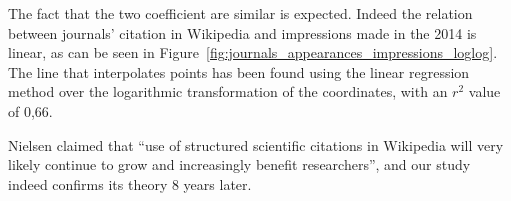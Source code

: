 The fact that the two coefficient are similar is expected.
Indeed the relation between journals' citation in Wikipedia and impressions made in the 2014 is linear, as can be seen in Figure~\ref{fig:journals_appearances_impressions_loglog}.
The line that interpolates points has been found using the linear regression method over the logarithmic transformation of the coordinates, with an $r^2$ value of 0,66.

Nielsen claimed that ``use of structured scientific citations in Wikipedia will very likely continue to grow and increasingly benefit researchers'', and our study indeed confirms its theory 8 years later.

